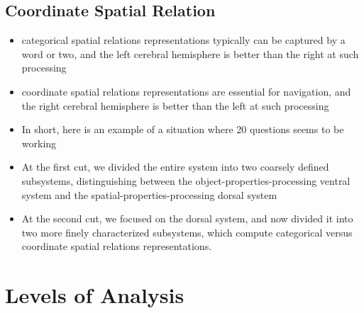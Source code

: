 \documentclass[12pt]{article}
\begin{document}
\subsection{Coordinate Spatial Relation}

\begin{itemize}

\item categorical spatial relations representations typically can be captured by a word or two, and the left cerebral hemisphere is better than the right at such processing
\item coordinate spatial relations representations are essential for navigation, and the right cerebral hemisphere is better than the left at such processing
\item In short, here is an example of a situation where 20 questions seems to be working
\item At the first cut, we divided the entire system into two coarsely defined subsystems, distinguishing between the object-properties-processing ventral system and the spatial-properties-processing dorsal system
\item At the second cut, we focused on the dorsal system, and now divided it into two more finely characterized subsystems, which compute categorical versus coordinate spatial relations representations.
\end{itemize}

\section{Levels of Analysis}
\end{document}
